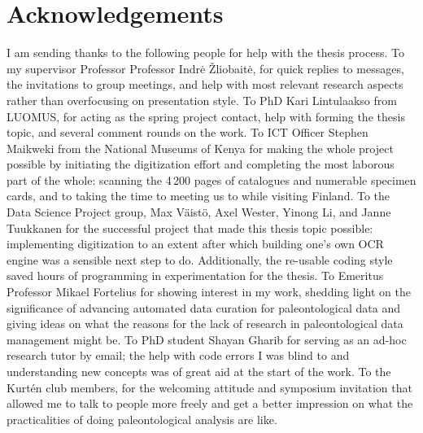 \documentclass[english,twoside,openright]{UH_DS_MSc}
\begin{document}
\chapter{Acknowledgements}

I am sending thanks to the following people for help with the thesis process.
To my supervisor Professor Professor Indr{\.e} \v{Z}liobait{\.e}, for quick replies to messages, the invitations to group meetings, and help with most relevant research aspects rather than overfocusing on presentation style.
To PhD Kari Lintulaakso from LUOMUS, for acting as the spring project contact, help with forming the thesis topic, and several comment rounds on the work.
To ICT Officer Stephen Maikweki from the National Museums of Kenya for making the whole project possible by initiating the digitization effort and completing the most laborous part of the whole: scanning the 4\,200 pages of catalogues and numerable specimen cards, and to taking the time to meeting us to while visiting Finland.
To the Data Science Project group, Max V\"{a}ist\"{o}, Axel Wester, Yinong Li, and Janne Tuukkanen for the successful project that made this thesis topic possible: implementing digitization to an extent after which building one's own OCR engine was a sensible next step to do. Additionally, the re-usable coding style saved hours of programming in experimentation for the thesis.
To Emeritus Professor Mikael Fortelius for showing interest in my work, shedding light on the significance of advancing automated data curation for paleontological data and giving ideas on what the reasons for the lack of research in paleontological data management might be.
To PhD student Shayan Gharib for serving as an ad-hoc research tutor by email; the help with code errors I was blind to and understanding new concepts was of great aid at the start of the work.
To the Kurt\'{e}n club members, for the welcoming attitude and symposium invitation that allowed me to talk to people more freely and get a better impression on what the practicalities of doing paleontological analysis are like.

\cleardoublepage
{}



\end{document}
